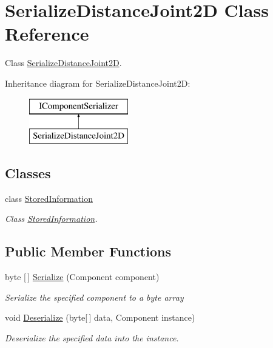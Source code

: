 \hypertarget{class_serialize_distance_joint2_d}{}\section{Serialize\+Distance\+Joint2D Class Reference}
\label{class_serialize_distance_joint2_d}


Class \hyperlink{class_serialize_distance_joint2_d}{Serialize\+Distance\+Joint2D}.  


Inheritance diagram for Serialize\+Distance\+Joint2D\+:\begin{figure}[H]
\begin{center}
\leavevmode
\includegraphics[height=2.000000cm]{class_serialize_distance_joint2_d}
\end{center}
\end{figure}
\subsection*{Classes}
\begin{DoxyCompactItemize}
\item 
class \hyperlink{class_serialize_distance_joint2_d_1_1_stored_information}{Stored\+Information}
\begin{DoxyCompactList}\small\item\em Class \hyperlink{class_serialize_distance_joint2_d_1_1_stored_information}{Stored\+Information}. \end{DoxyCompactList}\end{DoxyCompactItemize}
\subsection*{Public Member Functions}
\begin{DoxyCompactItemize}
\item 
byte \mbox{[}$\,$\mbox{]} \hyperlink{class_serialize_distance_joint2_d_a5eecfd9c48d46eb25958ffb301924b3b}{Serialize} (Component component)
\begin{DoxyCompactList}\small\item\em Serialize the specified component to a byte array \end{DoxyCompactList}\item 
void \hyperlink{class_serialize_distance_joint2_d_a0b7341e25aba6354afa746c912bb20f5}{Deserialize} (byte\mbox{[}$\,$\mbox{]} data, Component instance)
\begin{DoxyCompactList}\small\item\em Deserialize the specified data into the instance. \end{DoxyCompactList}\end{DoxyCompactItemize}


